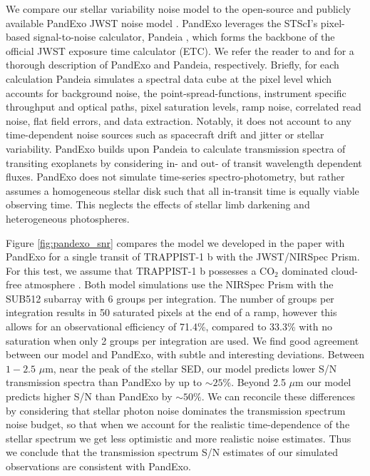 We compare our stellar variability noise model to the open-source and publicly available PandExo JWST noise model \citep{Batalha2017}. PandExo leverages the STScI's pixel-based signal-to-noise calculator, Pandeia \citep{Pontoppidan2016}, which forms the backbone of the official JWST exposure time calculator (ETC). We refer the reader to \citet{Batalha2017} and \citet{Pontoppidan2016} for a thorough description of PandExo and Pandeia, respectively. Briefly, for each calculation Pandeia simulates a spectral data cube at the pixel level which accounts for background noise, the point-spread-functions, instrument specific throughput and optical paths, pixel saturation levels, ramp noise, correlated read noise, flat field errors, and data extraction. Notably, it does not account to any time-dependent noise sources such as spacecraft drift and jitter or stellar variability. PandExo builds upon Pandeia to calculate transmission spectra of transiting exoplanets by considering in- and out- of transit wavelength dependent fluxes. PandExo does not simulate time-series spectro-photometry, but rather assumes a homogeneous stellar disk such that all in-transit time is equally viable observing time. This neglects the effects of stellar limb darkening and heterogeneous photospheres. 

Figure \ref{fig:pandexo_snr} compares the model we developed in the paper with PandExo for a single transit of TRAPPIST-1 b with the JWST/NIRSpec Prism. For this test, we assume that TRAPPIST-1 b possesses a CO$_2$ dominated cloud-free atmosphere \citep{Lincowski2018}. Both model simulations use the NIRSpec Prism with the SUB512 subarray with 6 groups per integration. The number of groups per integration results in 50 saturated pixels at the end of a ramp, however this allows for an observational efficiency of 71.4\%, compared to 33.3\% with no saturation when only 2 groups per integration are used. We find good agreement between our model and PandExo, with subtle and interesting deviations. Between $1-2.5$ $\mu$m, near the peak of the stellar SED, our model predicts lower S/N transmission spectra than PandExo by up to ${\sim} 25\%$. Beyond 2.5 $\mu$m our model predicts higher S/N than PandExo by ${\sim} 50\%$. We can reconcile these differences by considering that stellar photon noise dominates the transmission spectrum noise budget, so that when we account for the realistic time-dependence of the stellar spectrum we get less optimistic and more realistic noise estimates. %
Thus we conclude that the transmission spectrum S/N estimates of our simulated observations are consistent with PandExo.

